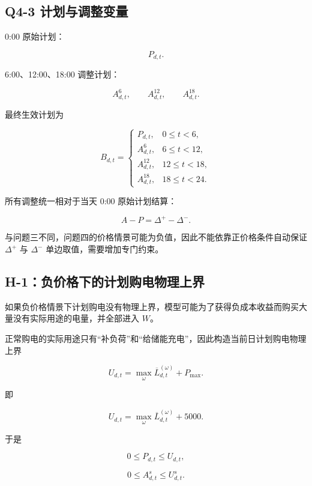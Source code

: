 \subsection{Q4-3 计划与调整变量}

0:00 原始计划：

\[
P_{d,t}.
\]

6:00、12:00、18:00 调整计划：

\[
A^6_{d,t},
\qquad
A^{12}_{d,t},
\qquad
A^{18}_{d,t}.
\]

最终生效计划为

\begin{equation}
B_{d,t}
=
\begin{cases}
P_{d,t},&0\le t<6,\\
A^6_{d,t},&6\le t<12,\\
A^{12}_{d,t},&12\le t<18,\\
A^{18}_{d,t},&18\le t<24.
\end{cases}
\end{equation}

所有调整统一相对于当天 0:00 原始计划结算：

\begin{equation}
A-P
=
\Delta^+-\Delta^-.
\end{equation}

与问题三不同，问题四的价格情景可能为负值，因此不能依靠正价格条件自动保证 \(\Delta^+\) 与 \(\Delta^-\) 单边取值，需要增加专门约束。

\subsection{H-1：负价格下的计划购电物理上界}

如果负价格情景下计划购电没有物理上界，模型可能为了获得负成本收益而购买大量没有实际用途的电量，并全部进入 \(W\)。

正常购电的实际用途只有“补负荷”和“给储能充电”，因此构造当前日计划购电物理上界

\begin{equation}
U_{d,t}
=
\max_{\omega}
\overline L_{d,t}^{(\omega)}
+
P_{\max}.
\end{equation}

即

\[
U_{d,t}
=
\max_{\omega}
\overline L_{d,t}^{(\omega)}
+
5000.
\]

于是

\[
0\le P_{d,t}\le U_{d,t},
\]

\begin{equation}
0\le A^s_{d,t}\le U^s_{d,t}.
\end{equation}

